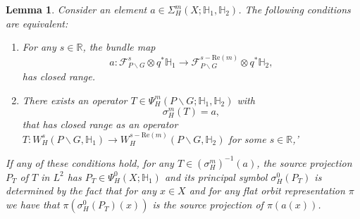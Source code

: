 \documentclass[a4paper,reqno]{amsart}
\numberwithin{equation}{section}
\def\R{\mathbb{R}}
\newtheorem{lemma}[thm]{Lemma}
\theoremstyle{definition}
\theoremstyle{remark}
\begin{document}
 
\begin{lemma}
\label{alknalkdn}
Consider an element $a\in \Sigma^m_H(X;\mathbb{H}_1,\mathbb{H}_2)$. The following conditions are equivalent:
\begin{enumerate}
\item For any $s\in \R$, the bundle map 
$$a:\mathcal{F}_{P\backslash G}^s\otimes q^*\mathbb{H}_1\to \mathcal{F}_{P\backslash G}^{s-\mathrm{Re}(m)}\otimes q^*\mathbb{H}_2,$$ 
has closed range.
\item There exists an operator $T\in \Psi^m_H(P\backslash G;\mathbb{H}_1,\mathbb{H}_2)$ with 
$$\sigma^m_H(T)=a,$$
that has closed range as an operator $T:W^s_H(P\backslash G,\mathbb{H}_1)\to W^{s-\mathrm{Re}(m)}_H(P\backslash G,\mathbb{H}_2)$ for some $s\in \R$,'
\end{enumerate}
If any of these conditions hold, for any $T\in (\sigma_H^m)^{-1}(a)$, the source projection $P_T$ of $T$ in $L^2$ has $P_T\in \Psi^0_H(X;\mathbb{H}_1)$ and its principal symbol $\sigma_H^0(P_T)$ is determined by the fact that for any $x\in X$ and for any flat orbit representation $\pi$ we have that $\pi(\sigma_H^0(P_T)(x))$ is the source projection of $\pi(a(x))$.
\end{lemma}
\end{document}
